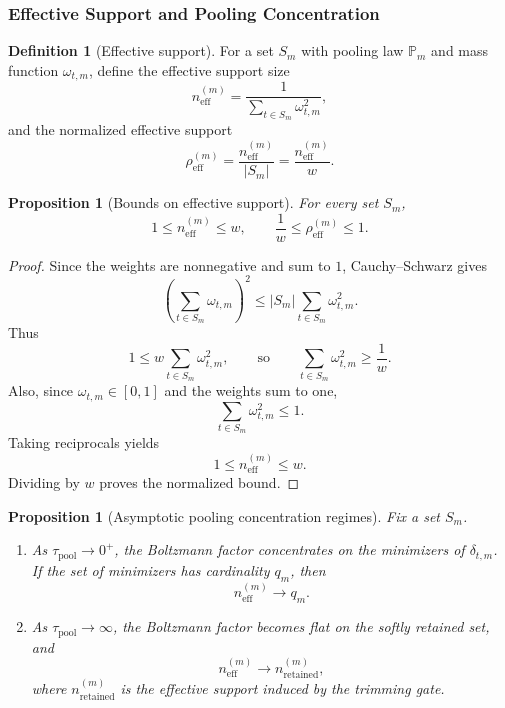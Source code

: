 \documentclass{article}
\theoremstyle{plain}
\newtheorem{proposition}[theorem]{Proposition}
\theoremstyle{definition}
\newtheorem{definition}[theorem]{Definition}
\theoremstyle{remark}
\begin{document}
\subsubsection{Effective Support and Pooling Concentration}
\label{sec:tier-b-effective-support}

\begin{definition}[Effective support]
\label{def:effective-support}
For a set $S_m$ with pooling law $\mathbb{P}_m$ and mass function $\omega_{t,m}$, define the effective support size
\begin{equation}
\label{eq:effective-support}
n_{\mathrm{eff}}^{(m)}
=
\frac{1}{\sum_{t\in S_m} \omega_{t,m}^2},
\end{equation}
and the normalized effective support
\begin{equation}
\label{eq:normalized-effective-support}
\rho_{\mathrm{eff}}^{(m)}
=
\frac{n_{\mathrm{eff}}^{(m)}}{|S_m|}
=
\frac{n_{\mathrm{eff}}^{(m)}}{w}.
\end{equation}
\end{definition}

\begin{proposition}[Bounds on effective support]
\label{prop:effective-support-bounds}
For every set $S_m$,
\begin{equation}
\label{eq:effective-support-bounds}
1 \le n_{\mathrm{eff}}^{(m)} \le w,
\qquad
\frac{1}{w}\le \rho_{\mathrm{eff}}^{(m)}\le 1.
\end{equation}
\end{proposition}

\begin{proof}
Since the weights are nonnegative and sum to $1$, Cauchy--Schwarz gives
\[
\left(\sum_{t\in S_m}\omega_{t,m}\right)^2
\le
|S_m| \sum_{t\in S_m}\omega_{t,m}^2.
\]
Thus
\[
1 \le w \sum_{t\in S_m}\omega_{t,m}^2,
\qquad\text{so}\qquad
\sum_{t\in S_m}\omega_{t,m}^2 \ge \frac{1}{w}.
\]
Also, since $\omega_{t,m}\in [0,1]$ and the weights sum to one,
\[
\sum_{t\in S_m}\omega_{t,m}^2 \le 1.
\]
Taking reciprocals yields
\[
1 \le n_{\mathrm{eff}}^{(m)} \le w.
\]
Dividing by $w$ proves the normalized bound.
\end{proof}

\begin{proposition}[Asymptotic pooling concentration regimes]
\label{prop:pooling-concentration-regimes}
Fix a set $S_m$.

\begin{enumerate}
    \item As $\tau_{\mathrm{pool}}\to 0^+$, the Boltzmann factor concentrates on the minimizers of $\delta_{t,m}$. If the set of minimizers has cardinality $q_m$, then
    \[
    n_{\mathrm{eff}}^{(m)} \to q_m.
    \]

    \item As $\tau_{\mathrm{pool}}\to \infty$, the Boltzmann factor becomes flat on the softly retained set, and
    \[
    n_{\mathrm{eff}}^{(m)} \to n_{\mathrm{retained}}^{(m)},
    \]
    where $n_{\mathrm{retained}}^{(m)}$ is the effective support induced by the trimming gate.
\end{enumerate}
\end{proposition}
\end{document}
